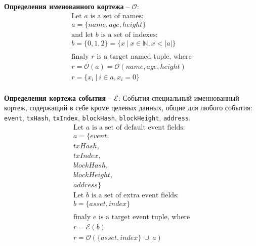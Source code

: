 \documentclass[12pt]{report}
\def\code#1{\colorbox{light-gray}{\texttt{#1}}}
\begin{document}
\textbf{Определения именованного кортежа} – $\mathcal{O}$:
\begin{equation}
\begin{aligned}
\text{Let } a \text{ is a set of names: } \\
a = \{name, age, height\} \\
\text{and let } b \text{ is a set of indexes: } \\
b = \{0, 1, 2\} = \{x \ | \ x \in \mathbb{N}, x < |a|\} \\
\\
\text{finaly } r \text{ is a target named tuple, where} \\
r = \mathcal{O}(a) = \mathcal{O}(name, age, height) \\ 
r = \{x_i \ | \ i \in  a, x_i = 0 \} \\
\end{aligned}
\end{equation}

\textbf{Определения кортежа события} – $\mathcal{E}$:\hfill\null\linebreak
События специальный именнованный кортеж, содержащий в себе кроме целевых данных, общие для любого события: \code{event}, \code{txHash}, \code{txIndex}, \code{blockHash}, \code{blockHeight}, \code{address}.
\begin{equation}
\begin{aligned}
\text{Let } a \text{ is a set of default event fields: } \\
a = \{event, \\
txHash, \\
txIndex, \\
blockHash, \\
blockHeight, \\
address\} \\
\text{Let } b \text{ is a set of extra event fields: } \\
b = \{asset, index\} \\
\\
\text{finaly } e \text{ is a target event tuple, where} \\
r = \mathcal{E}(b) \\
r = \mathcal{O}(\{asset, index\} \ \cup \ a)
\end{aligned}
\end{equation}

\pagebreak
\end{document}
